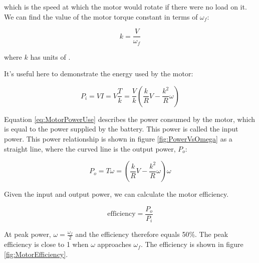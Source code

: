 which is the speed at which the motor would rotate if there were no load on it. We can find the value of the motor torque constant in terms of $\omega_{f}$:

\begin{equation}
k = \frac{V}{\omega_{f}}
\label{eq:MotorTorqueConstant}
\end{equation}

where $k$ has units of .

It's useful here to demonstrate the energy used by the motor:

\begin{equation}
P_{i} = VI = V\frac{T}{k} = \frac{V}{k}\left(\frac{k}{R}V - \frac{k^2}{R}\omega\right)
\label{eq:MotorPowerUse}
\end{equation}

Equation \ref{eq:MotorPowerUse} describes the power consumed by the motor, which is equal to the power supplied by the battery. This power is called the input power. This power relationship is shown in figure \ref{fig:PowerVsOmega} as a straight line, where the curved line is the output power, $P_{o}$:

\begin{equation}
P_{o} = T\omega= \left(\frac{k}{R}V - \frac{k^2}{R}\omega\right)\omega
\label{eq:MotorPowerOutput}
\end{equation}

Given the input and output power, we can calculate the motor efficiency.

\begin{equation}
\mbox{efficiency} = \frac{P_{o}}{P_{i}}
\label{eq:MotorEfficiency}
\end{equation}

At peak power, $\omega = \frac{\omega_{f}}{2}$ and the efficiency therefore equals 50\%. The peak efficiency is close to 1 when $\omega$ approaches $\omega_{f}$. The efficiency is shown in figure \ref{fig:MotorEfficiency}.

